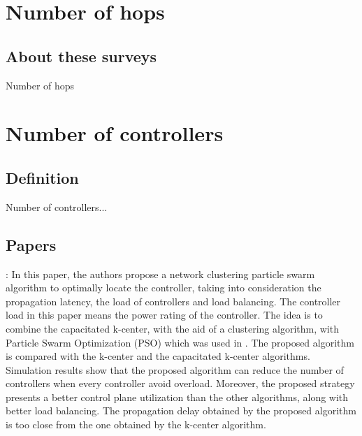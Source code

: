 \documentclass[a4paper,10pt]{article}
\begin{document}
\section{Number of hops}
\subsection{About these surveys}
Number of hops
%
%
%
%

\section{Number of controllers}
\subsection{Definition}
Number of controllers...

\subsection{Papers}
\cite{LiWa15}: In this paper, the authors propose a network clustering particle swarm algorithm to optimally locate the controller, taking into consideration the propagation latency, the load of controllers and load balancing. The controller load in this paper means the power rating of the controller. The idea is to combine the capacitated k-center, with the aid of a clustering algorithm, with Particle Swarm Optimization (PSO) which was used in \cite{GaWa15}. The proposed algorithm is compared with the k-center and the capacitated k-center algorithms. Simulation results show that the proposed algorithm can reduce the number of controllers when every controller avoid overload. Moreover, the proposed strategy presents a better control plane utilization than the other algorithms, along with better load balancing. The propagation delay obtained by the proposed algorithm is too close from the one obtained by the k-center algorithm. 
\end{document}
